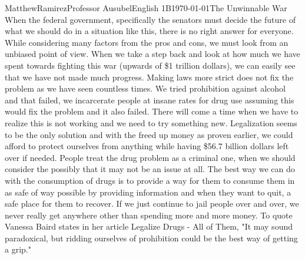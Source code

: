 \documentclass[12pt,letterpaper]{article}
\begin{document}
\begin{mla}{Matthew}{Ramirez}{Professor Ausubel}{English 1B}{\today}{The Unwinnable War}
When the federal government, specifically the senators must decide the future of what we should do in a situation like this, there is no right answer for everyone. While considering many factors from the pros and cons, we must look from an unbiased point of view. When we take a step back and look at how much we have spent towards fighting this war (upwards of \$1 trillion dollars), we can easily see that we have not made much progress. Making laws more strict does not fix the problem as we have seen countless times. We tried prohibition against alcohol and that failed, we incarcerate people at insane rates for drug use assuming this would fix the problem and it also failed. There will come a time when we have to realize this is not working and we need to try something new. Legalization seems to be the only solution and with the freed up money as proven earlier, we could afford to protect ourselves from anything while having \$56.7 billion dollars left over if needed. People treat the drug problem as a criminal one, when we should consider the possibly that it may not be an issue at all. The best way we can do with the consumption of drugs is to provide a way for them to consume them in as safe of way possible by providing information and when they want to quit, a safe place for them to recover. If we just continue to jail people over and over, we never really get anywhere other than spending more and more money. To quote Vanessa Baird states in her article Legalize Drugs - All of Them, "It may sound paradoxical, but ridding ourselves of prohibition could be the best way of getting a grip."


\end{mla}
\end{document}
